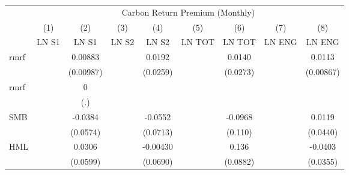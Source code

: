 {
\def\sym#1{\ifmmode^{#1}\else\(^{#1}\)\fi}
\begin{tabular}{l*{8}{c}}
\hline\hline
                    &\multicolumn{8}{c}{Carbon Return Premium (Monthly)}                                                                                                                            \\\cmidrule(lr){2-9}
                    &\multicolumn{1}{c}{(1)}&\multicolumn{1}{c}{(2)}&\multicolumn{1}{c}{(3)}&\multicolumn{1}{c}{(4)}&\multicolumn{1}{c}{(5)}&\multicolumn{1}{c}{(6)}&\multicolumn{1}{c}{(7)}&\multicolumn{1}{c}{(8)}\\
                    &\multicolumn{1}{c}{LN S1}&\multicolumn{1}{c}{LN S1}&\multicolumn{1}{c}{LN S2}&\multicolumn{1}{c}{LN S2}&\multicolumn{1}{c}{LN TOT}&\multicolumn{1}{c}{LN TOT}&\multicolumn{1}{c}{LN ENG}&\multicolumn{1}{c}{LN ENG}\\
\hline
rmrf                &                     &     0.00883         &                     &      0.0192         &                     &      0.0140         &                     &      0.0113         \\
                    &                     &   (0.00987)         &                     &    (0.0259)         &                     &    (0.0273)         &                     &   (0.00867)         \\
rmrf                &                     &           0         &                     &                     &                     &                     &                     &                     \\
                    &                     &         (.)         &                     &                     &                     &                     &                     &                     \\
SMB                 &                     &     -0.0384         &                     &     -0.0552         &                     &     -0.0968         &                     &      0.0119         \\
                    &                     &    (0.0574)         &                     &    (0.0713)         &                     &     (0.110)         &                     &    (0.0440)         \\
HML                 &                     &      0.0306         &                     &    -0.00430         &                     &       0.136         &                     &     -0.0403         \\
                    &                     &    (0.0599)         &                     &    (0.0690)         &                     &    (0.0882)         &                     &    (0.0355)         \\

\end{tabular}}
